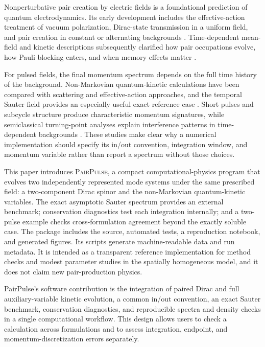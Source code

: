 \documentclass[a4paper,fleqn]{cas-dc}
\newcommand{\PairPulse}{\textsc{PairPulse}}
\begin{document}
Nonperturbative pair creation by electric fields is a foundational prediction of quantum electrodynamics. Its early development includes the effective-action treatment of vacuum polarization, Dirac-state transmission in a uniform field, and pair creation in constant or alternating backgrounds \cite{EulerHeisenberg1936,Sauter1931,Schwinger1951,BrezinItzykson1970}. Time-dependent mean-field and kinetic descriptions subsequently clarified how pair occupations evolve, how Pauli blocking enters, and when memory effects matter \cite{Kluger1991,Kluger1992,Kluger1998,Schmidt1998,Schmidt1999}.

For pulsed fields, the final momentum spectrum depends on the full time history of the background. Non-Markovian quantum-kinetic calculations have been compared with scattering and effective-action approaches, and the temporal Sauter field provides an especially useful exact reference case \cite{Hebenstreit2008,Schutzhold2008,Dumlu2009,Hebenstreit2010,Fedotov2011,Huet2014}. Short pulses and subcycle structure produce characteristic momentum signatures, while semiclassical turning-point analyses explain interference patterns in time-dependent backgrounds \cite{Hebenstreit2009,DumluDunne2010,DumluDunne2011a,DumluDunne2011b,Akkermans2012,Li2014}. These studies make clear why a numerical implementation should specify its in/out convention, integration window, and momentum variable rather than report a spectrum without those choices.

This paper introduces \PairPulse, a compact computational-physics program that evolves two independently represented mode systems under the same prescribed field: a two-component Dirac spinor and the non-Markovian quantum-kinetic variables. The exact asymptotic Sauter spectrum provides an external benchmark; conservation diagnostics test each integration internally; and a two-pulse example checks cross-formulation agreement beyond the exactly soluble case. The package includes the source, automated tests, a reproduction notebook, and generated figures. Its scripts generate machine-readable data and run metadata. It is intended as a transparent reference implementation for method checks and modest parameter studies in the spatially homogeneous model, and it does not claim new pair-production physics.


PairPulse's software contribution is the integration of paired Dirac and full auxiliary-variable kinetic evolution, a common in/out convention, an exact Sauter benchmark, conservation diagnostics, and reproducible spectra and density checks in a single computational workflow. This design allows users to check a calculation across formulations and to assess integration, endpoint, and momentum-discretization errors separately.
\end{document}
